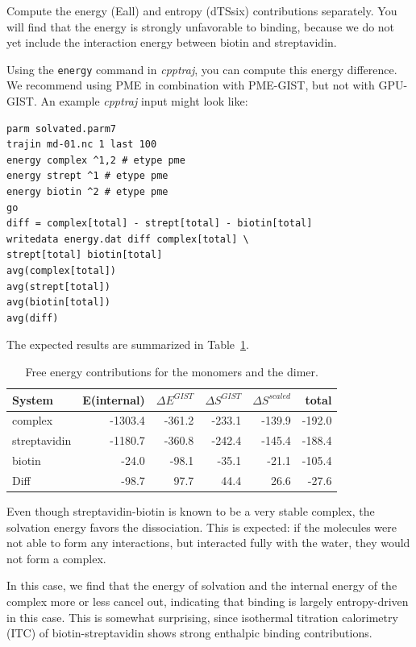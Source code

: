 \documentclass[9pt,tutorial]{livecoms}
\newcommand{\software}{\emph}
\newcommand\inlinecode{\texttt}
\begin{document}
Compute the energy (Eall) and entropy (dTSsix) contributions separately.
You will find that the energy is strongly unfavorable to binding, because we do not yet include the interaction energy between biotin and streptavidin.

Using the \inlinecode{energy} command in \software{cpptraj}, you can compute this energy difference.
We recommend using PME in combination with PME-GIST, but not with GPU-GIST\@.
An example \software{cpptraj} input might look like:
\begin{lstlisting}
parm solvated.parm7
trajin md-01.nc 1 last 100
energy complex ^1,2 # etype pme
energy strept ^1 # etype pme
energy biotin ^2 # etype pme
go
diff = complex[total] - strept[total] - biotin[total]
writedata energy.dat diff complex[total] \
strept[total] biotin[total]
avg(complex[total])
avg(strept[total])
avg(biotin[total])
avg(diff)
\end{lstlisting}

The expected results are summarized in Table~\ref{tab_dg_monomers_dimer}.

\begin{table}
	\caption{Free energy contributions for the monomers and the dimer.}\label{tab_dg_monomers_dimer}
	\small
	\begin{tabular}{lrrrrr}
		\toprule
		System       & E(internal) & $\Delta E^\textit{GIST}$ & $\Delta S^\textit{GIST}$ & $\Delta S^\textit{scaled}$ & total \\
		\midrule
		complex      & -1303.4 & -361.2 & -233.1 & -139.9 & -192.0 \\
		streptavidin & -1180.7 & -360.8 & -242.4 & -145.4 & -188.4 \\
		biotin       & -24.0   &  -98.1 &  -35.1 &  -21.1 & -105.4 \\
		Diff         & -98.7   &   97.7 &   44.4 &   26.6 &  -27.6
	\end{tabular}
\end{table}

Even though streptavidin-biotin is known to be a very stable complex, the solvation energy favors the dissociation.
This is expected: if the molecules were not able to form any interactions, but interacted fully with the water, they would not form a complex.

In this case, we find that the energy of solvation and the internal energy of the complex more or less cancel out, indicating that binding is largely entropy-driven in this case.
This is somewhat surprising, since isothermal titration calorimetry (ITC) of biotin-streptavidin shows strong enthalpic binding contributions.\cite{mpye2020-biotin-itc}\cite{hyre2006-biotin-itc}
\end{document}
